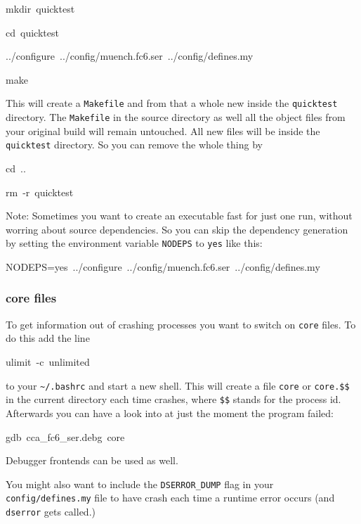 \begin{lyxcode}
mkdir~quicktest

cd~quicktest

../configure~../config/muench.fc6.ser~../config/defines.my

make
\end{lyxcode}
This will create a \texttt{Makefile} and from that a whole new \ccarat{}
inside the \texttt{quicktest} directory. The \texttt{Makefile} in
the source directory as well all the object files from your original
build will remain untouched. All new files will be inside the \texttt{quicktest}
directory. So you can remove the whole thing by

\begin{lyxcode}
cd~..

rm~-r~quicktest
\end{lyxcode}
Note: Sometimes you want to create an executable fast for just one
run, without worring about source dependencies. So you can skip the
dependency generation by setting the environment variable \texttt{NODEPS}
to \texttt{yes} like this:

\begin{lyxcode}
NODEPS=yes~../configure~../config/muench.fc6.ser~../config/defines.my
\end{lyxcode}

\subsubsection{core files}

To get information out of crashing \ccarat{} processes you want to
switch on \texttt{core} files. To do this add the line

\begin{lyxcode}
ulimit~-c~unlimited
\end{lyxcode}
to your \texttt{\textasciitilde{}/.bashrc} and start a new shell.
This will create a file \texttt{core} or \texttt{core.\$\$} in the
current directory each time \ccarat{} crashes, where \texttt{\$\$}
stands for the process id. Afterwards you can have a look into \ccarat{}
at just the moment the program failed:

\begin{lyxcode}
gdb~cca\_fc6\_ser.debg~core
\end{lyxcode}
Debugger frontends can be used as well.

You might also want to include the \texttt{DSERROR\_DUMP} flag in
your \texttt{config/defines.my} file to have \ccarat{} crash each
time a runtime error occurs (and \texttt{dserror} gets called.)

